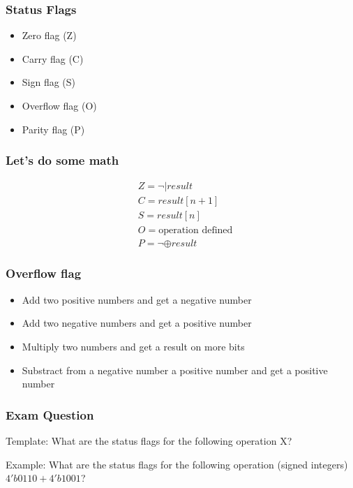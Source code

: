 \begin{frame}
        \frametitle{Status Flags}
        \begin{itemize}
            \item Zero flag (Z)
            \item Carry flag (C)
            \item Sign flag (S)
            \item Overflow flag (O)
            \item Parity flag (P)
        \end{itemize}
\end{frame}

\begin{frame}
    \frametitle{Let's do some math}
    \begin{equation}
        \begin{aligned}
            &Z=\neg | result\\
            &C=result[n+1]\\
            &S=result[n]\\
            &O=\text{operation defined}\\
            &P=\neg \oplus result
        \end{aligned}
    \end{equation}
\end{frame}

\begin{frame}
    \frametitle{Overflow flag}
    \begin{itemize}
        \item Add two positive numbers and get a negative number
        \item Add two negative numbers and get a positive number
        \item Multiply two numbers and get a result on more bits
        \item Substract from a negative number a positive number and get a positive number
    \end{itemize}
\end{frame}

\begin{frame}
    \frametitle{Exam Question}
    Template: What are the status flags for the following operation X?

    Example: What are the status flags for the following operation (signed integers) $4'b0110+4'b1001$?
\end{frame}
    